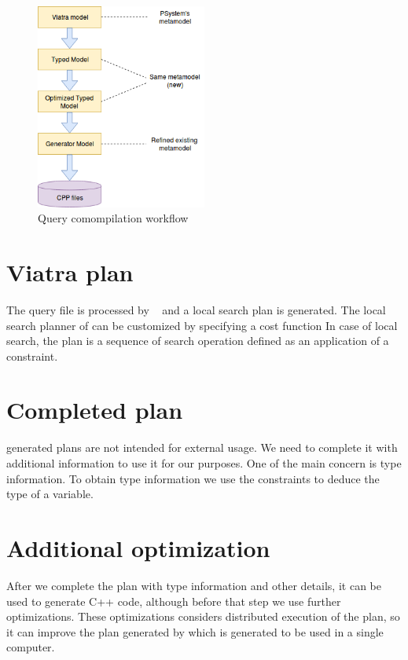 \begin{figure}[h]
	\begin{center}
		\includegraphics[width=0.5\textwidth]{figures/workflow.png}
		\caption{Query comompilation workflow}
		\label{figure:query-compile-workflow}
	\end{center}
\end{figure}


\section{Viatra plan}

The query file is processed by \viatra{}~\cite{viatra} and a local search plan is generated. 
The local search planner of \viatra{} can be customized by specifying a cost function
In case of local search, the plan is a sequence of search operation defined as an application of a constraint.


\section{Completed plan}

\viatra{} generated plans are not intended for external usage. 
We need to complete it with additional information to use it for our purposes. 
One of the main concern is type information. To obtain type information we use the constraints to deduce the type of a variable. 


\section{Additional optimization}

After we complete the plan with type information and other details, it can be used to generate C++ code, although before that step we use further optimizations. 
These optimizations considers distributed execution of the plan, so it can improve the plan generated by \viatra{} which is generated to be used in a single computer.



